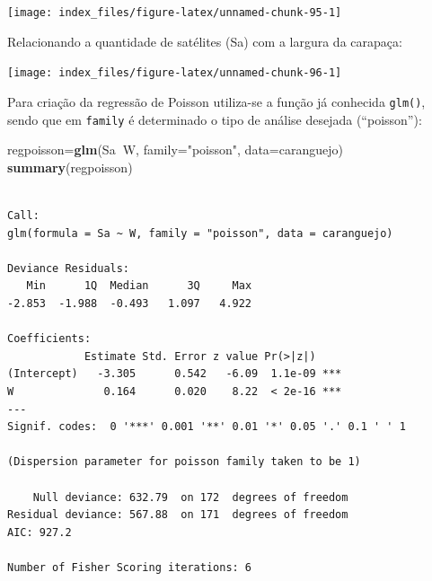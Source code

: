 \documentclass[12pt,brazil,oneside]{book}
\newenvironment{Shaded}{\begin{snugshade}}{\end{snugshade}}
\newcommand{\DataTypeTok}[1]{\textcolor[rgb]{0.13,0.29,0.53}{#1}}
\newcommand{\KeywordTok}[1]{\textcolor[rgb]{0.13,0.29,0.53}{\textbf{#1}}}
\newcommand{\NormalTok}[1]{#1}
\newcommand{\OperatorTok}[1]{\textcolor[rgb]{0.81,0.36,0.00}{\textbf{#1}}}
\newcommand{\StringTok}[1]{\textcolor[rgb]{0.31,0.60,0.02}{#1}}
\begin{document}
\begin{center}\texttt{[image: index\_files/figure-latex/unnamed-chunk-95-1]} \end{center}

Relacionando a quantidade de satélites (Sa) com a largura da carapaça:

\begin{Shaded}
\end{Shaded}

\begin{center}\texttt{[image: index\_files/figure-latex/unnamed-chunk-96-1]} \end{center}

Para criação da regressão de Poisson utiliza-se a função já conhecida \texttt{glm()}, sendo que em \texttt{family} é determinado o tipo de análise desejada (``poisson''):

\begin{Shaded}
\begin{Highlighting}[]
\NormalTok{regpoisson=}\KeywordTok{glm}\NormalTok{(Sa}\OperatorTok{~}\NormalTok{W, }\DataTypeTok{family=}\StringTok{"poisson"}\NormalTok{, }\DataTypeTok{data=}\NormalTok{caranguejo)}
\KeywordTok{summary}\NormalTok{(regpoisson)}
\end{Highlighting}
\end{Shaded}

\begin{verbatim}

Call:
glm(formula = Sa ~ W, family = "poisson", data = caranguejo)

Deviance Residuals: 
   Min      1Q  Median      3Q     Max  
-2.853  -1.988  -0.493   1.097   4.922  

Coefficients:
            Estimate Std. Error z value Pr(>|z|)    
(Intercept)   -3.305      0.542   -6.09  1.1e-09 ***
W              0.164      0.020    8.22  < 2e-16 ***
---
Signif. codes:  0 '***' 0.001 '**' 0.01 '*' 0.05 '.' 0.1 ' ' 1

(Dispersion parameter for poisson family taken to be 1)

    Null deviance: 632.79  on 172  degrees of freedom
Residual deviance: 567.88  on 171  degrees of freedom
AIC: 927.2

Number of Fisher Scoring iterations: 6
\end{verbatim}
\end{document}
